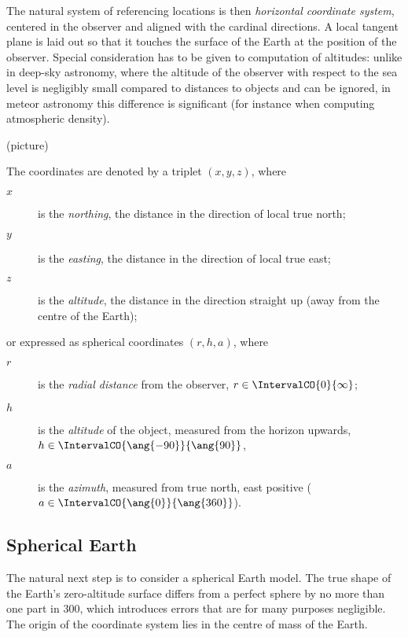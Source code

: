         The natural system of referencing locations is then \emph{horizontal coordinate system},
        centered in the observer and aligned with the cardinal directions.
        A local tangent plane is laid out so that it touches the surface of the Earth
        at the position of the observer. Special consideration has to be given to computation of altitudes:
        unlike in deep-sky astronomy, where the altitude of the observer with respect to the sea level
        is negligibly small compared to distances to objects and can be ignored, in meteor astronomy
        this difference is significant (for instance when computing atmospheric density).

        (picture)

        The coordinates are denoted by a triplet $(x, y, z)$, where
        \begin{description}
            \item[$x$]  is the \emph{northing}, the distance in the direction of local true north;
            \item[$y$]  is the \emph{easting}, the distance in the direction of local true east;
            \item[$z$]  is the \emph{altitude}, the distance in the direction straight up
                (away from the centre of the Earth);
        \end{description}
        or expressed as spherical coordinates $(r, h, a)$, where
        \begin{description}
            \item[$r$]  is the \emph{radial distance} from the observer,
                $r \in \IntervalCO{0}{\infty}$;
            \item[$h$]  is the \emph{altitude} of the object, measured from the horizon upwards,
                $h \in \IntervalCO{\ang{-90}}{\ang{90}}$,
            \item[$a$]  is the \emph{azimuth}, measured from true north, east positive
                ($a \in \IntervalCO{\ang{0}}{\ang{360}}$).
        \end{description}


    \subsection{Spherical Earth} \label{mms}
        The natural next step is to consider a spherical Earth model.
        The true shape of the Earth's zero-altitude surface differs from
        a perfect sphere by no more than one part in 300, which introduces errors
        that are for many purposes negligible.
        The origin of the coordinate system lies in the centre of mass of the Earth.        

